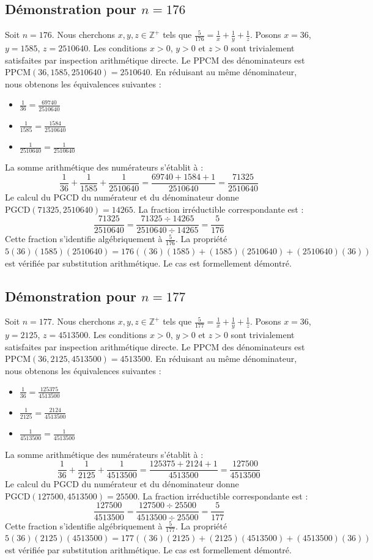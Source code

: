 \documentclass[12pt,a4paper]{article}
\begin{document}
\subsection{Démonstration pour $n = 176$}
Soit $n = 176$. Nous cherchons $x, y, z \in \mathbb{Z}^{+}$ tels que $\frac{5}{176} = \frac{1}{x} + \frac{1}{y} + \frac{1}{z}$.
Posons $x = 36$, $y = 1585$, $z = 2510640$.
Les conditions $x > 0$, $y > 0$ et $z > 0$ sont trivialement satisfaites par inspection arithmétique directe.
Le PPCM des dénominateurs est $\text{PPCM}(36, 1585, 2510640) = 2510640$.
En réduisant au même dénominateur, nous obtenons les équivalences suivantes :
\begin{itemize}
    \item $\frac{1}{36} = \frac{69740}{2510640}$
    \item $\frac{1}{1585} = \frac{1584}{2510640}$
    \item $\frac{1}{2510640} = \frac{1}{2510640}$
\end{itemize}
La somme arithmétique des numérateurs s'établit à :
$$ \frac{1}{36} + \frac{1}{1585} + \frac{1}{2510640} = \frac{69740 + 1584 + 1}{2510640} = \frac{71325}{2510640} $$
Le calcul du PGCD du numérateur et du dénominateur donne $\text{PGCD}(71325, 2510640) = 14265$.
La fraction irréductible correspondante est :
$$ \frac{71325}{2510640} = \frac{71325 \div 14265}{2510640 \div 14265} = \frac{5}{176} $$
Cette fraction s'identifie algébriquement à $\frac{5}{176}$.
La propriété $5(36)(1585)(2510640) = 176((36)(1585) + (1585)(2510640) + (2510640)(36))$ est vérifiée par substitution arithmétique.
Le cas est formellement démontré.

\subsection{Démonstration pour $n = 177$}
Soit $n = 177$. Nous cherchons $x, y, z \in \mathbb{Z}^{+}$ tels que $\frac{5}{177} = \frac{1}{x} + \frac{1}{y} + \frac{1}{z}$.
Posons $x = 36$, $y = 2125$, $z = 4513500$.
Les conditions $x > 0$, $y > 0$ et $z > 0$ sont trivialement satisfaites par inspection arithmétique directe.
Le PPCM des dénominateurs est $\text{PPCM}(36, 2125, 4513500) = 4513500$.
En réduisant au même dénominateur, nous obtenons les équivalences suivantes :
\begin{itemize}
    \item $\frac{1}{36} = \frac{125375}{4513500}$
    \item $\frac{1}{2125} = \frac{2124}{4513500}$
    \item $\frac{1}{4513500} = \frac{1}{4513500}$
\end{itemize}
La somme arithmétique des numérateurs s'établit à :
$$ \frac{1}{36} + \frac{1}{2125} + \frac{1}{4513500} = \frac{125375 + 2124 + 1}{4513500} = \frac{127500}{4513500} $$
Le calcul du PGCD du numérateur et du dénominateur donne $\text{PGCD}(127500, 4513500) = 25500$.
La fraction irréductible correspondante est :
$$ \frac{127500}{4513500} = \frac{127500 \div 25500}{4513500 \div 25500} = \frac{5}{177} $$
Cette fraction s'identifie algébriquement à $\frac{5}{177}$.
La propriété $5(36)(2125)(4513500) = 177((36)(2125) + (2125)(4513500) + (4513500)(36))$ est vérifiée par substitution arithmétique.
Le cas est formellement démontré.
\end{document}
